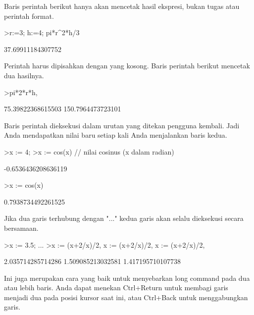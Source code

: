 \documentclass[a4paper,10pt]{article}
\begin{document}
\begin{eulernotebook}
\begin{eulercomment}
\begin{eulercomment}
\begin{eulercomment}
Baris perintah berikut hanya akan mencetak hasil ekspresi, bukan tugas
atau perintah format.
\end{eulercomment}
\begin{eulerprompt}
>r:=3; h:=4; pi*r^2*h/3
\end{eulerprompt}
\begin{euleroutput}
  37.69911184307752
\end{euleroutput}
\begin{eulercomment}
Perintah harus dipisahkan dengan yang kosong. Baris perintah berikut
mencetak dua hasilnya.
\end{eulercomment}
\begin{eulerprompt}
>pi*2*r*h, %
\end{eulerprompt}
\begin{euleroutput}
  75.39822368615503
  150.7964473723101
\end{euleroutput}
\begin{eulercomment}
Baris perintah dieksekusi dalam urutan yang ditekan pengguna kembali.
Jadi Anda mendapatkan nilai baru setiap kali Anda menjalankan baris
kedua.
\end{eulercomment}
\begin{eulerprompt}
>x := 4;
>x := cos(x) // nilai cosinus (x dalam radian)
\end{eulerprompt}
\begin{euleroutput}
  -0.6536436208636119
\end{euleroutput}
\begin{eulerprompt}
>x := cos(x)
\end{eulerprompt}
\begin{euleroutput}
  0.7938734492261525
\end{euleroutput}
\begin{eulercomment}
Jika dua garis terhubung dengan "..." kedua garis akan selalu
dieksekusi secara bersamaan.
\end{eulercomment}
\begin{eulerprompt}
>x := 3.5; ...
>x := (x+2/x)/2, x := (x+2/x)/2, x := (x+2/x)/2,
\end{eulerprompt}
\begin{euleroutput}
  2.035714285714286
  1.509085213032581
  1.417195710107738
\end{euleroutput}
\begin{eulercomment}
Ini juga merupakan cara yang baik untuk menyebarkan long command pada
dua atau lebih baris. Anda dapat menekan Ctrl+Return untuk membagi
garis menjadi dua pada posisi kursor saat ini, atau Ctrl+Back untuk
menggabungkan garis.


\end{eulercomment}
\end{eulercomment}
\end{eulercomment}
\end{eulernotebook}
\end{document}
